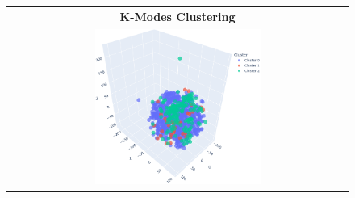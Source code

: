 \begin{figure}
\begin{tabular}{|c|c|}
		\\ \hline
	\end{tabular}
	\begin{tabular}{|c|}
		\hline
		\textbf{K-Modes Clustering} \\
		\includegraphics[width=0.5\textwidth]{NOTEBOOK/IMAGENES_CLUSTERING/9_TNSE_Kmodes}
		\\ \hline
	\end{tabular}
\end{figure}


